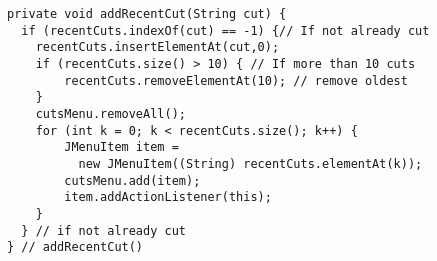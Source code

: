 \begin{ANS}
\begin{jjjlisting}
\begin{lstlisting}
private void addRecentCut(String cut) {
  if (recentCuts.indexOf(cut) == -1) {// If not already cut
    recentCuts.insertElementAt(cut,0);
    if (recentCuts.size() > 10) { // If more than 10 cuts
        recentCuts.removeElementAt(10); // remove oldest
    }
    cutsMenu.removeAll();
    for (int k = 0; k < recentCuts.size(); k++) {
        JMenuItem item = 
          new JMenuItem((String) recentCuts.elementAt(k));
        cutsMenu.add(item);
        item.addActionListener(this);
    }
  } // if not already cut
} // addRecentCut()
\end{lstlisting}
\end{jjjlisting}

\end{ANS}



\pagebreak
{}
\label{exercises}

